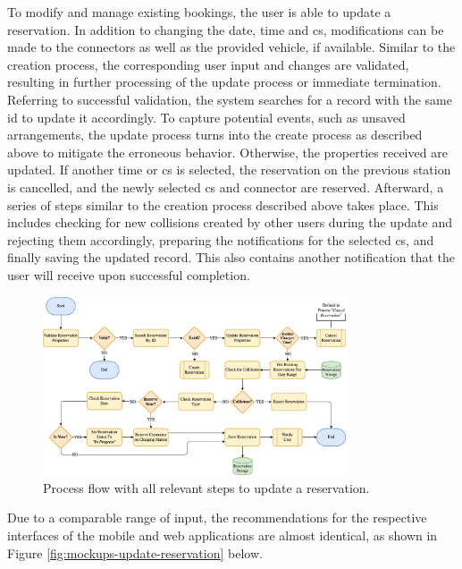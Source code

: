 To modify and manage existing bookings, the user is able to update a reservation. In addition to changing the date, time and \acrshort{cs}, modifications can be made to the connectors as well as the provided vehicle, if available. 
Similar to the creation process, the corresponding user input and changes are validated, resulting in further processing of the update process or immediate termination.
Referring to successful validation, the system searches for a record with the same \acrshort{id} to update it accordingly.
To capture potential events, such as unsaved arrangements, the update process turns into the create process as described above to mitigate the erroneous behavior.
Otherwise, the properties received are updated. If another time or \acrshort{cs} is selected, the reservation on the previous station is cancelled, and the newly selected \acrshort{cs} and connector are reserved.
Afterward, a series of steps similar to the creation process described above takes place. This includes checking for new collisions created by other users during the update and rejecting them accordingly, preparing the notifications for the selected \acrshort{cs}, and finally saving the updated record.
This also contains another notification that the user will receive upon successful completion.

\begin{figure}[h]
    \centering
    \includegraphics[width=0.8\textwidth,keepaspectratio]{resources/images/main/5_design/processes/ReservationUpdate.png}
    \caption{Process flow with all relevant steps to update a reservation.}
    \label{fig:update-reservation-flowchart}
\end{figure}

\noindent Due to a comparable range of input, the recommendations for the respective interfaces of the mobile and web applications are almost identical, as shown in Figure \ref{fig:mockups-update-reservation} below.

